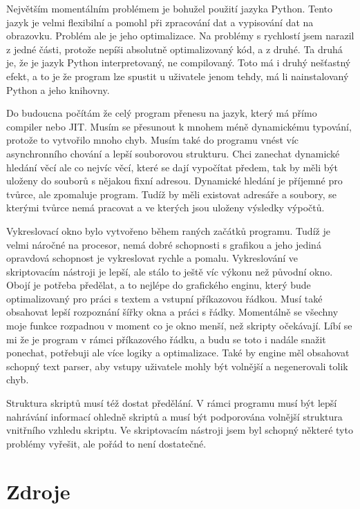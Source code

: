 \documentclass[12pt,a4paper]{article}
\begin{document}
Největším momentálním problémem je bohužel použití jazyka Python. Tento jazyk je velmi flexibilní a pomohl při zpracování dat a vypisování dat na obrazovku. Problém ale je jeho optimalizace. Na problémy s rychlostí jsem narazil z jedné části, protože nepíši absolutně optimalizovaný kód, a z druhé. Ta druhá je, že je jazyk Python interpretovaný, ne compilovaný. Toto má i druhý nešťastný efekt, a to je že program lze spustit u uživatele jenom tehdy, má li nainstalovaný Python a jeho knihovny.

Do budoucna počítám že celý program přenesu na jazyk, který má přímo compiler nebo JIT. Musím se přesunout k mnohem méně dynamickému typování, protože to vytvořilo mnoho chyb. Musím také do programu vnést víc asynchronního chování a lepší souborovou strukturu. Chci zanechat dynamické hledání věcí ale co nejvíc věcí, které se dají vypočítat předem, tak by měli být uloženy do souborů s nějakou fixní adresou. Dynamické hledání je příjemné pro tvůrce, ale zpomaluje program. Tudíž by měli existovat adresáře a soubory, se kterými tvůrce nemá pracovat a ve kterých jsou uloženy výsledky výpočtů.

Vykreslovací okno bylo vytvořeno během raných začátků programu. Tudíž je velmi náročné na procesor, nemá dobré schopnosti s grafikou a jeho jediná opravdová schopnost je vykreslovat rychle a pomalu. Vykreslování ve skriptovacím nástroji je lepší, ale stálo to ještě víc výkonu než původní okno. Obojí je potřeba předělat, a to nejlépe do grafického enginu, který bude optimalizovaný pro práci s textem a vstupní příkazovou řádkou. Musí také obsahovat lepší rozpoznání šířky okna a práci s řádky. Momentálně se všechny moje funkce rozpadnou v moment co je okno menší, než skripty očekávají. Líbí se mi že je program v rámci příkazového řádku, a budu se toto i nadále snažit ponechat, potřebuji ale více logiky a optimalizace. Také by engine měl obsahovat schopný text parser, aby vstupy uživatele mohly být volnější a negenerovali tolik chyb.

Struktura skriptů musí též dostat předělání. V rámci programu musí být lepší nahrávání informací ohledně skriptů a musí být podporována volnější struktura vnitřního vzhledu skriptu. Ve skriptovacím nástroji jsem byl schopný některé tyto problémy vyřešit, ale pořád to není dostatečné. 

\section{Zdroje}
\end{document}
